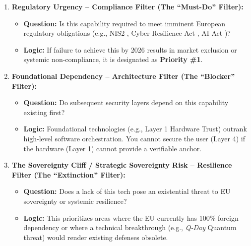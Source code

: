 \documentclass[12pt,a4paper]{article}
\begin{document}
\begin{enumerate}
    \item \textbf{Regulatory Urgency -- Compliance Filter (The ``Must-Do''  Filter):}
    \begin{itemize}
        \item \textbf{Question:} Is this capability required to meet imminent European regulatory obligations (e.g., NIS2 \cite{nis2}, Cyber Resilience Act \cite{cra}, AI Act \cite{aiact})?
        \item \textbf{Logic:} If failure to achieve this by 2026 results in market exclusion or systemic non-compliance, it is designated as \textbf{Priority \#1}.

\end{itemize}


    \item \textbf{Foundational Dependency -- Architecture Filter (The ``Blocker''  Filter):}
    \begin{itemize}
        \item \textbf{Question:} Do subsequent security layers depend on this capability existing first?
        \item \textbf{Logic:} Foundational technologies (e.g., Layer 1 Hardware Trust) outrank high-level software orchestration. You cannot secure the user (Layer 4) if the hardware (Layer 1) cannot provide a verifiable anchor.

    \end{itemize}

    \item \textbf{The Sovereignty Cliff / Strategic Sovereignty Risk -- Resilience Filter (The ``Extinction''  Filter):}
    \begin{itemize}
        \item \textbf{Question:} Does a lack of this tech pose an existential threat to EU sovereignty or systemic resilience?
        \item \textbf{Logic:} This prioritizes areas where the EU currently has 100\% foreign dependency or where a technical breakthrough (e.g., \textit{Q-Day} Quantum threat) would render existing defenses obsolete.


\end{itemize}
\end{enumerate}
\end{document}
